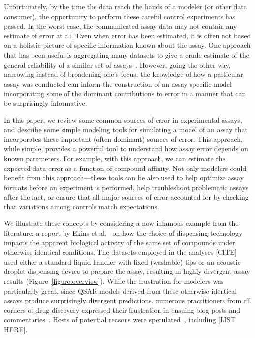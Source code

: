 \documentclass[aps,pre,twocolumn,nofootinbib,superscriptaddress,linenumbers]{revtex4-1}
\begin{document}
Unfortunately, by the time the data reach the hands of a modeler (or other data consumer), the opportunity to perform these careful control experiments has passed.
In the worst case, the communicated assay data may not contain any estimate of error at all. Even when error has been estimated, it is often not based on a holistic picture of specific information known about the assay.
One approach that has been useful is aggregating many datasets to give a crude estimate of the general reliability of a similar set of assays~\cite{kramer_experimental_2012,kalliokoski_comparability_2013}. However, going the other way, narrowing instead of broadening one's focus: the knowledge of how a particular assay was conducted can inform the construction of an assay-specific model incorporating some of the dominant contributions to error in a manner that can be surprisingly informative.



In this paper, we review some common sources of error in experimental assays, and describe some simple modeling tools for simulating a model of an assay that incorporates these important (often dominant) sources of error. 
This approach, while simple, provides a powerful tool to understand how assay error depends on  known parameters. For example, with this approach, we can estimate the expected data error as a function of compound affinity.
Not only modelers could benefit from this approach---these tools can be also used to help optimize assay formats before an experiment is performed, help troubleshoot problematic assays after the fact, or ensure that all major sources of error accounted for by checking that variations among controls match expectations.

We illustrate these concepts by considering a now-infamous example from the literature: a report by Ekins et al.~\cite{ekins_dispensing_2013} on how the choice of dispensing technology impacts the apparent biological activity of the same set of compounds under otherwise identical conditions.
The datasets employed in the analyses [CITE] used either a standard liquid handler with fixed (washable) tips or an acoustic droplet dispensing device to prepare the assay, resulting in highly divergent assay results (Figure~\ref{figure:overview}).
While the frustration for modelers was particularly great, since QSAR models derived from these otherwise identical assays produce surprisingly divergent predictions, numerous practitioners from all corners of drug discovery expressed their frustration in ensuing blog posts and commentaries~\cite{in-the-pipeline-comments}.
Hosts of potential reasons were speculated~\cite{in-the-pipeline-comments}, including [LIST HERE].
\end{document}
